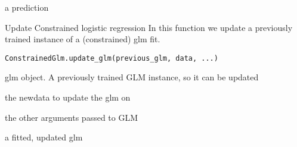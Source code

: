 \documentclass[a4paper]{book}
\begin{document}
%
\begin{Value}
a prediction
\end{Value}
%
\begin{Description}\relax
Update Constrained logistic regression
In this function we update a previously trained instance of a (constrained)
glm fit.
\end{Description}
%
\begin{Usage}
\begin{verbatim}
ConstrainedGlm.update_glm(previous_glm, data, ...)
\end{verbatim}
\end{Usage}
%
\begin{Arguments}
\begin{ldescription}
\item[\code{previous\_glm}] glm object. A previously trained GLM instance, so it can be updated

\item[\code{data}] the newdata to update the glm on

\item[\code{...}] the other arguments passed to GLM
\end{ldescription}
\end{Arguments}
%
\begin{Value}
a fitted, updated glm
\end{Value}
\end{document}
